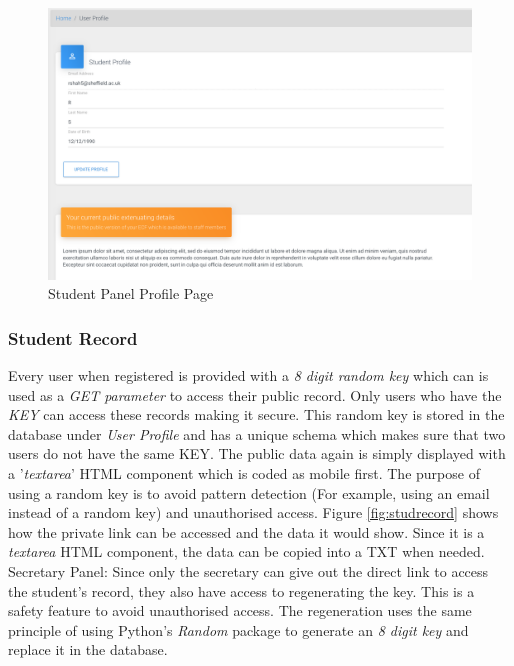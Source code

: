 \documentclass[../main.tex]{subfiles}
\begin{document}
\begin{figure}[H]
        \includegraphics[scale=0.7]
        {images/profile.png}
        \caption{\label{fig:profile} Student Panel Profile Page}
      \end{figure}

\subsubsection{Student Record} 
Every user when registered is provided with a\textit{ 8 digit random key} which can is used as a \textit{GET parameter} to access their public record. Only users who have the \textit{KEY} can access these records making it secure. This random key is stored in the database under \textit{User Profile} and has a unique schema which makes sure that two users do not have the same KEY. The public data again is simply displayed with a '\textit{textarea}' HTML component which is coded as mobile first. The purpose of using a random key is to avoid pattern detection (For example, using an email instead of a random key) and unauthorised access. Figure \ref{fig:studrecord} shows how the private link can be accessed and the data it would show. Since it is a \textit{textarea} HTML component, the data can be copied into a TXT when needed. \\[4mm]

Secretary Panel: Since only the secretary can give out the direct link to access the student's record, they also have access to regenerating the key. This is a safety feature to avoid unauthorised access. The regeneration uses the same principle of using Python's \textit{Random} package to generate an \textit{8 digit key} and replace it in the database. 
\end{document}
